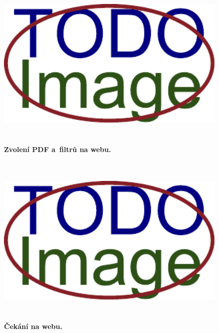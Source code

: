 \begin{figure}[H]
    \centering
    \includegraphics[width=\linewidth,height=3.3in]{obrazky-figures/placeholder.pdf}
    \caption{\textbf{Zvolení PDF a~filtrů na webu.} }
\end{figure}

\dummyShortText[8]

\begin{figure}[H]
    \centering
    \includegraphics[width=\linewidth,height=3.3in]{obrazky-figures/placeholder.pdf}
    \caption{\textbf{Čekání na webu.} }
\end{figure}

\dummyText

